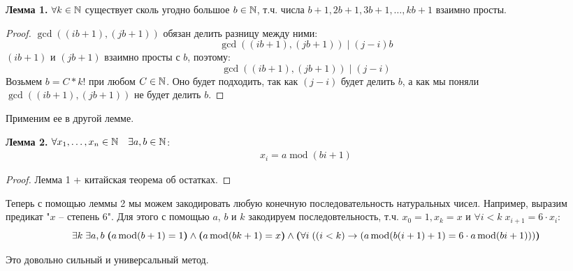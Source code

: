\textbf{Лемма 1.}
    $\forall k \in \mathbb{N}$ существует сколь угодно большое $b \in \mathbb{N}$, т.ч. числа $b+1, 2b+1, 3b+1, \dots, kb+1$ взаимно просты. 

\begin{proof}
    $\gcd((ib + 1), (jb + 1))$ обязан делить разницу между ними: \[ \gcd((ib + 1), (jb + 1)) \mid (j - i)b \]
    $(ib + 1)$ и $(jb + 1)$ взаимно просты с $b$, поэтому: \[ \gcd((ib + 1), (jb + 1)) \mid (j - i) \]
    Возьмем $b = C * k!$ при  любом $C \in \mathbb{N}$. Оно будет подходить, так как $(j - i)$ будет делить $b$, а как мы поняли $\gcd((ib + 1), (jb + 1))$ не будет делить $b$.
\end{proof}

\vspace{3mm}

Применим ее в другой лемме.

\textbf{Лемма 2.}
    $\forall x_1, \dots, x_n \in \mathbb{N} \quad \exists a,b \in \mathbb{N}$:
   \begin{gather*}
       x_i = a \operatorname{mod} (bi + 1)
   \end{gather*}

\begin{proof}
    Лемма 1  + китайская теорема об остатках. 
\end{proof}

Теперь с помощью леммы 2 мы можем закодировать любую конечную последовательность натуральных чисел. Например, выразим предикат "$x$ -- степень 6". Для этого с помощью $a$, $b$ и $k$ закодируем последовтельность, т.ч. $x_0 = 1, x_k = x$ и $\forall i < k \; x_{i + 1} = 6 \cdot x_i$: \[ \exists k \; \exists a, b \; \textbf(a \operatorname{mod} (b + 1) = 1 \textbf) \land \textbf(a \operatorname{mod} (bk + 1) = x \textbf) \land \textbf(\forall i \; ((i < k) \to (a \operatorname{mod} (b(i+1) + 1) = 6 \cdot a \operatorname{mod} (bi + 1))) \textbf) \]

Это довольно сильный и универсальный метод.
